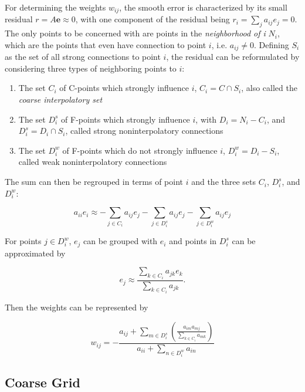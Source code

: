 For determining the weights $w_{ij}$, the smooth error is characterized by its small residual $r = A\mathbf{e} \approx 0$, with one component of the residual being $r_i = \sum_{j}{a_{ij}e_j} = 0$. The only points to be concerned with are points in the \emph{neighborhood of i} $N_i$, which are the points that even have connection to point $i$, i.e. $a_{ij} \neq 0$. Defining $S_i$ as the set of all strong connections to point $i$, the residual can be reformulated by considering three types of neighboring points to $i$:
\begin{enumerate}
	\item The set $C_i$ of C-points which strongly influence $i$, $C_i = C \cap S_i$, also called the \emph{coarse interpolatory set}
	\item The set $D_i^s$ of F-points which strongly influence $i$, with $D_i = N_i - C_i$, and $D_i^s = D_i \cap S_i$, called strong noninterpolatory connections
	\item The set $D_i^w$ of F-points which do not strongly influence $i$, $D_i^w = D_i - S_i$, called weak noninterpolatory connections
\end{enumerate}

The sum can then be regrouped in terms of point $i$ and the three sets $C_i$, $D_i^s$, and $D_i^w$:

\begin{equation}
	a_{ii}e_i \approx -\sum_{j \in C_i}{a_{ij}e_j} - \sum_{j \in D_i^s}{a_{ij}e_j} - \sum_{j \in D_i^w}{a_{ij}e_j}
\end{equation}

For points $j \in D_i^w$, $e_j$ can be grouped with $e_i$ and points in $D_i^s$ can be approximated by 

\begin{equation}
	e_j \approx \frac{\displaystyle \sum_{k \in C_i}{a_{jk}e_k}}{\displaystyle \sum_{k \in C_i}{a_{jk}}}.
	\label{ej_approx}
\end{equation}

Then the weights can be represented by

\begin{equation}
	w_{ij} = - \frac{a_{ij} + \displaystyle \sum_{m \in D_i^s}{\left(\frac{a_{im}a_{mj}}{\displaystyle \sum_{k \in C_i}{a_{mk}}}\right)}}{a_{ii} + \displaystyle \sum_{n \in D_i^w}{a_{in}}}
\end{equation}

\subsection{Coarse Grid} %

